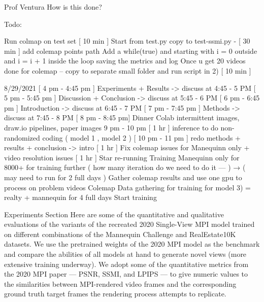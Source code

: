 Prof Ventura How is this done?


Todo:


Run colmap on test set  [ 10 min ] 
Start from test.py copy to test-ssmi.py - [ 30 min ]
add colemap points path
Add a while(true) and starting with i = 0 outside and i = i + 1 inside the loop 
saving the metrics and log 
Once u get 20 videos done for colemap -- copy to separate small folder and run script in 2) [ 10 min ] 

8/29/2021
[ 4 pm - 4:45 pm ] Experiments + Results -> discuss at 4:45 - 5 PM 
[ 5 pm - 5:45 pm ] Discussion + Conclusion -> discuss at 5:45 - 6 PM 
[ 6 pm - 6:45 pm ] Introduction -> discuss at 6:45 - 7 PM
[ 7 pm - 7:45 pm ] Methods -> discuss at 7:45 - 8 PM 
[ 8 pm - 8:45 pm] Dinner 
Colab intermittent images, draw.io pipelines, paper images
9 pm - 10 pm [ 1 hr ] inference to do non-randomized coding ( model 1 , model 2 ) 
 [ 10 pm - 11 pm ] redo methods + results + conclusion -> intro 
[ 1 hr ] Fix colemap issues for Manequinn only + video resolution issues 
[ 1 hr ] Star re-running Training Manequinn only for 8000+ for training further ( how many iteration do we need to do it --- ) → ( may need to run for 2 full days ) 
Gather colemap results and use one gpu to process on problem videos
Colemap Data gathering for training for model 3) = { realty + mannequin } for 4 full days 
Start training 




Experiments Section
Here are some of the quantitative and qualitative evaluations of the variants of the recreated 2020 Single-View MPI model trained on different combinations of the Mannequin Challenge and RealEstate10K datasets. We use the pretrained weights of the 2020 MPI model as the benchmark and compare the abilities of all models at hand to generate novel views (more extensive training underway). We adopt some of the quantitative metrics from the 2020 MPI paper \cite{single_view_mpi} --- PSNR, SSMI, and LPIPS --- to give numeric values to the similarities between MPI-rendered video frames and the corresponding ground truth target frames the rendering process attempts to replicate. 

